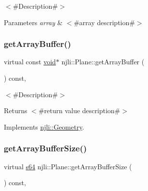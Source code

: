 $<$\#\+Description\#$>$


\begin{DoxyParams}{Parameters}
{\em array} & $<$\#array description\#$>$ \\
\hline
\end{DoxyParams}
\mbox{\label{classnjli_1_1_plane_a134447dc787dab9269e68f8011e2973f}} 
\subsubsection{\texorpdfstring{get\+Array\+Buffer()}{getArrayBuffer()}}
{\footnotesize\ttfamily virtual const \mbox{\hyperlink{_thread_8h_af1e856da2e658414cb2456cb6f7ebc66}{void}}$\ast$ njli\+::\+Plane\+::get\+Array\+Buffer (\begin{DoxyParamCaption}{ }\end{DoxyParamCaption}) const\hspace{0.3cm}{\ttfamily [protected]}, {\ttfamily [virtual]}}

$<$\#\+Description\#$>$

\begin{DoxyReturn}{Returns}
$<$\#return value description\#$>$ 
\end{DoxyReturn}


Implements \mbox{\hyperlink{classnjli_1_1_geometry_adbf0ae6c38f23779df2b37708e80c24c}{njli\+::\+Geometry}}.

\mbox{\label{classnjli_1_1_plane_ad7e4c804fee51739e0696e34c7146a3a}} 
\subsubsection{\texorpdfstring{get\+Array\+Buffer\+Size()}{getArrayBufferSize()}}
{\footnotesize\ttfamily virtual \mbox{\hyperlink{_util_8h_a4258bfb2c3a440d06c4aaa3c2b450dde}{s64}} njli\+::\+Plane\+::get\+Array\+Buffer\+Size (\begin{DoxyParamCaption}{ }\end{DoxyParamCaption}) const\hspace{0.3cm}{\ttfamily [protected]}, {\ttfamily [virtual]}}

